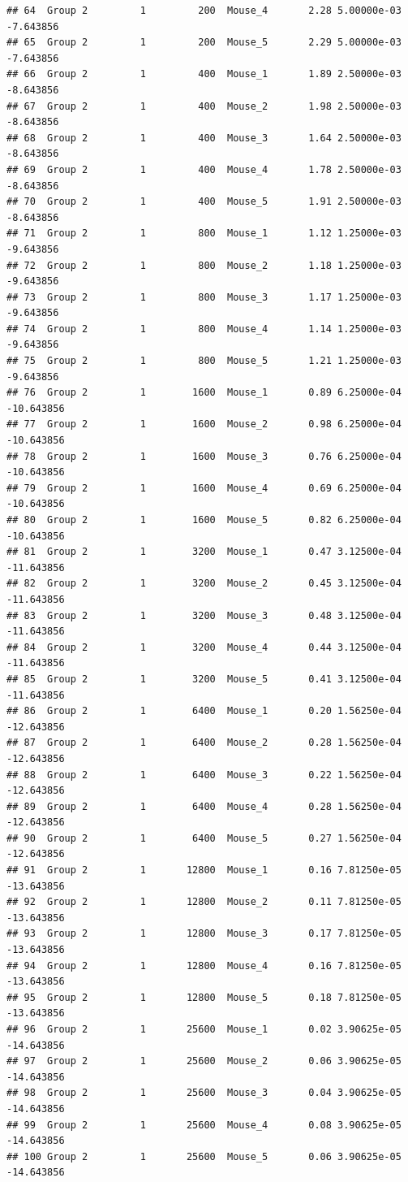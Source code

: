 \documentclass[
]{book}
\begin{document}
\begin{verbatim}
## 64  Group 2         1         200  Mouse_4       2.28 5.00000e-03    -7.643856
## 65  Group 2         1         200  Mouse_5       2.29 5.00000e-03    -7.643856
## 66  Group 2         1         400  Mouse_1       1.89 2.50000e-03    -8.643856
## 67  Group 2         1         400  Mouse_2       1.98 2.50000e-03    -8.643856
## 68  Group 2         1         400  Mouse_3       1.64 2.50000e-03    -8.643856
## 69  Group 2         1         400  Mouse_4       1.78 2.50000e-03    -8.643856
## 70  Group 2         1         400  Mouse_5       1.91 2.50000e-03    -8.643856
## 71  Group 2         1         800  Mouse_1       1.12 1.25000e-03    -9.643856
## 72  Group 2         1         800  Mouse_2       1.18 1.25000e-03    -9.643856
## 73  Group 2         1         800  Mouse_3       1.17 1.25000e-03    -9.643856
## 74  Group 2         1         800  Mouse_4       1.14 1.25000e-03    -9.643856
## 75  Group 2         1         800  Mouse_5       1.21 1.25000e-03    -9.643856
## 76  Group 2         1        1600  Mouse_1       0.89 6.25000e-04   -10.643856
## 77  Group 2         1        1600  Mouse_2       0.98 6.25000e-04   -10.643856
## 78  Group 2         1        1600  Mouse_3       0.76 6.25000e-04   -10.643856
## 79  Group 2         1        1600  Mouse_4       0.69 6.25000e-04   -10.643856
## 80  Group 2         1        1600  Mouse_5       0.82 6.25000e-04   -10.643856
## 81  Group 2         1        3200  Mouse_1       0.47 3.12500e-04   -11.643856
## 82  Group 2         1        3200  Mouse_2       0.45 3.12500e-04   -11.643856
## 83  Group 2         1        3200  Mouse_3       0.48 3.12500e-04   -11.643856
## 84  Group 2         1        3200  Mouse_4       0.44 3.12500e-04   -11.643856
## 85  Group 2         1        3200  Mouse_5       0.41 3.12500e-04   -11.643856
## 86  Group 2         1        6400  Mouse_1       0.20 1.56250e-04   -12.643856
## 87  Group 2         1        6400  Mouse_2       0.28 1.56250e-04   -12.643856
## 88  Group 2         1        6400  Mouse_3       0.22 1.56250e-04   -12.643856
## 89  Group 2         1        6400  Mouse_4       0.28 1.56250e-04   -12.643856
## 90  Group 2         1        6400  Mouse_5       0.27 1.56250e-04   -12.643856
## 91  Group 2         1       12800  Mouse_1       0.16 7.81250e-05   -13.643856
## 92  Group 2         1       12800  Mouse_2       0.11 7.81250e-05   -13.643856
## 93  Group 2         1       12800  Mouse_3       0.17 7.81250e-05   -13.643856
## 94  Group 2         1       12800  Mouse_4       0.16 7.81250e-05   -13.643856
## 95  Group 2         1       12800  Mouse_5       0.18 7.81250e-05   -13.643856
## 96  Group 2         1       25600  Mouse_1       0.02 3.90625e-05   -14.643856
## 97  Group 2         1       25600  Mouse_2       0.06 3.90625e-05   -14.643856
## 98  Group 2         1       25600  Mouse_3       0.04 3.90625e-05   -14.643856
## 99  Group 2         1       25600  Mouse_4       0.08 3.90625e-05   -14.643856
## 100 Group 2         1       25600  Mouse_5       0.06 3.90625e-05   -14.643856
\end{verbatim}
\end{document}
